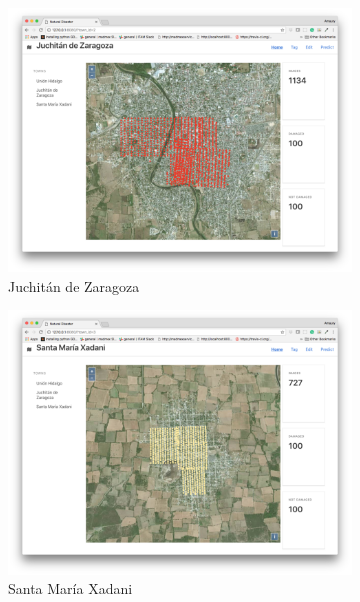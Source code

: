\begin{figure}[ht]
  \centering
    \begin{subfigure}{.55\textwidth}
        \includegraphics[width=\textwidth]{images/small-app-juchitan.png}
        \caption{Juchit\'an de Zaragoza}
    \end{subfigure}
    \begin{subfigure}{.55\textwidth}
        \includegraphics[width=\textwidth]{images/small-app-santamaria.png}
        \caption{Santa Mar\'ia Xadani}
    \end{subfigure}
    \begin{subfigure}{.55\textwidth}

\end{subfigure}
\end{figure}
